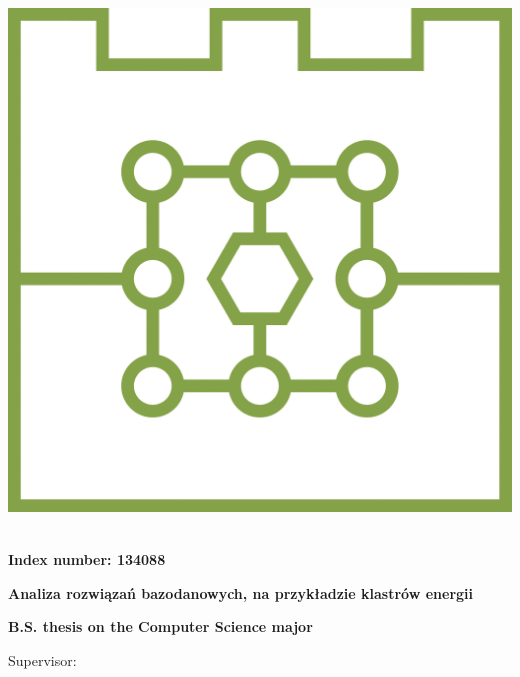 \begin{titlepage}
\begin{minipage}{0.2\textwidth}
    \includegraphics[width=\linewidth]{gfx/LOGO_FACULTY} \\ 
  \end{minipage}

  \vfill
  \vfill

  \begin{center}
    \Large \textbf{\myName}\\
    \vspace{0.3cm}
    \Large \textbf{Index number: 134088}\\
  \end{center}

  \vfill

  \begin{center}
    \LARGE \textbf{Analiza rozwiązań bazodanowych, na przykładzie klastrów energii}
  \end{center} 
  
  \begin{center}
    \LARGE \textbf{\myTitle}
  \end{center} 
  
  \begin{center}
    \LARGE \textbf{B.S. thesis on the Computer Science major}
  \end{center}
  
  \vfill
  
  \hspace{0.6\textwidth} 
  \begin{minipage}{0.4\textwidth}
  Supervisor: \\
  \textbf{\myProf} \\


\end{minipage}
\end{titlepage}
